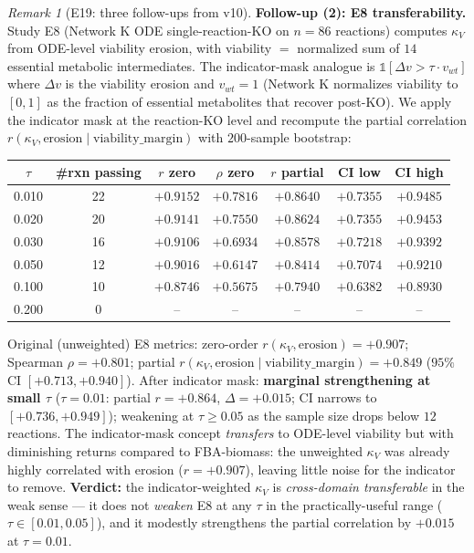 \documentclass[11pt,a4paper]{article}
\theoremstyle{plain}
\theoremstyle{definition}
\theoremstyle{remark}
\newtheorem{remark}[theorem]{Remark}
\begin{document}
\begin{remark}[E19: three follow-ups from v10]
\textbf{Follow-up (2): E8 transferability.} Study E8 (Network K ODE
single-reaction-KO on $n=86$ reactions) computes $\kappa_V$ from
ODE-level viability erosion, with viability $=$ normalized sum of $14$
essential metabolic intermediates. The indicator-mask analogue is
$\mathbb{1}[\Delta v > \tau \cdot v_{wt}]$ where $\Delta v$ is the
viability erosion and $v_{wt} = 1$ (Network K normalizes viability to
$[0, 1]$ as the fraction of essential metabolites that recover
post-KO). We apply the indicator mask at the reaction-KO level and
recompute the partial correlation
$r(\kappa_V, \mathrm{erosion} \mid \mathrm{viability\_margin})$ with
$200$-sample bootstrap:

\begin{center}
\begin{tabular}{ccccccc}
\toprule
$\tau$ & \#rxn passing & $r$ zero & $\rho$ zero & $r$ partial &
CI low & CI high \\
\midrule
0.010 & 22 & $+0.9152$ & $+0.7816$ & $+0.8640$ & $+0.7355$ & $+0.9485$ \\
0.020 & 20 & $+0.9141$ & $+0.7550$ & $+0.8624$ & $+0.7355$ & $+0.9453$ \\
0.030 & 16 & $+0.9106$ & $+0.6934$ & $+0.8578$ & $+0.7218$ & $+0.9392$ \\
0.050 & 12 & $+0.9016$ & $+0.6147$ & $+0.8414$ & $+0.7074$ & $+0.9210$ \\
0.100 & 10 & $+0.8746$ & $+0.5675$ & $+0.7940$ & $+0.6382$ & $+0.8930$ \\
0.200 & 0 & -- & -- & -- & -- & -- \\
\bottomrule
\end{tabular}
\end{center}

Original (unweighted) E8 metrics: zero-order $r(\kappa_V, \mathrm{erosion})
= +0.907$; Spearman $\rho = +0.801$; partial $r(\kappa_V, \mathrm{erosion}
\mid \mathrm{viability\_margin}) = +0.849$ ($95\%$ CI $[+0.713, +0.940]$).
After indicator mask: \textbf{marginal strengthening at small $\tau$}
($\tau = 0.01$: partial $r = +0.864$, $\Delta = +0.015$; CI narrows to
$[+0.736, +0.949]$); weakening at $\tau \geq 0.05$ as the sample size
drops below $12$ reactions. The indicator-mask concept \emph{transfers}
to ODE-level viability but with diminishing returns compared to
FBA-biomass: the unweighted $\kappa_V$ was already highly correlated
with erosion ($r = +0.907$), leaving little noise for the indicator to
remove. \textbf{Verdict:} the indicator-weighted $\kappa_V$ is
\emph{cross-domain transferable} in the weak sense — it does not
\emph{weaken} E8 at any $\tau$ in the practically-useful range
($\tau \in [0.01, 0.05]$), and it modestly strengthens the partial
correlation by $+0.015$ at $\tau = 0.01$.


\end{remark}
\end{document}
